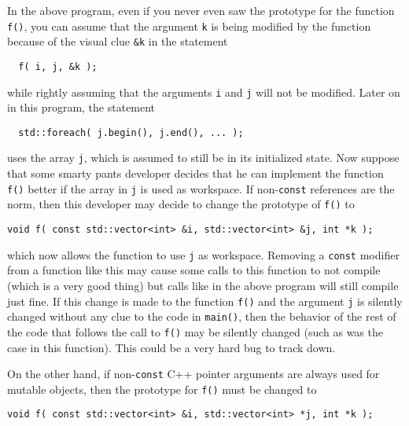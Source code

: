 In the above program, even if you never even saw the prototype
for the function {}\texttt{f()}, you can assume that the argument
{}\texttt{k} is being modified by the function because of the visual
clue {}\texttt{\&k} in the statement

{\scriptsize\begin{verbatim}
  f( i, j, &k );
\end{verbatim}}

{}\noindent{}while rightly assuming that the arguments {}\texttt{i}
and {}\texttt{j} will not be modified.  Later on in this program,
the statement

{\scriptsize\begin{verbatim}
  std::foreach( j.begin(), j.end(), ... );
\end{verbatim}}

{}\noindent{}uses the array {}\texttt{j}, which is assumed to still be
in its initialized state.  Now suppose that some smarty pants developer
decides that he can implement the function {}\texttt{f()} better if
the array in {}\texttt{j} is used as workspace.  If non-\texttt{const}
references are the norm, then this developer may decide to change the
prototype of {}\texttt{f()} to

{\scriptsize\begin{verbatim}
void f( const std::vector<int> &i, std::vector<int> &j, int *k );
\end{verbatim}}

{}\noindent{}which now allows the function to use {}\texttt{j} as
workspace.  Removing a {}\texttt{const} modifier from a function like
this may cause some calls to this function to not compile (which is a
very good thing) but calls like in the above program will still
compile just fine.  If this change is made to the function
{}\texttt{f()} and the argument {}\texttt{j} is silently changed
without any clue to the code in {}\texttt{main()}, then the behavior
of the rest of the code that follows the call to {}\texttt{f()} may be
silently changed (such as was the case in this function).  This could
be a very hard bug to track down.

On the other hand, if non-\texttt{const} C++ pointer arguments are
always used for mutable objects, then the prototype for {}\texttt{f()}
must be changed to 

{\scriptsize\begin{verbatim}
void f( const std::vector<int> &i, std::vector<int> *j, int *k );
\end{verbatim}}

